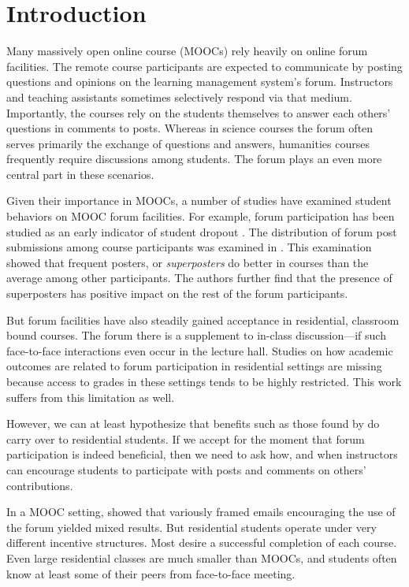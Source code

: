 \section{Introduction}

Many massively open online course (MOOCs) rely heavily on online forum
facilities. The remote course participants are expected to communicate
by posting questions and opinions on the learning management system's
forum. Instructors and teaching assistants sometimes selectively
respond via that medium. Importantly, the courses rely on the students
themselves to answer each others' questions in comments to
posts. Whereas in science courses the forum often serves primarily the
exchange of questions and answers, humanities courses frequently
require discussions among students. The forum plays an even more
central part in these scenarios.

Given their importance in MOOCs, a number of studies have examined
student behaviors on MOOC forum facilities. For example, forum
participation has been studied as an early indicator of student
dropout \cite{yang2013}. The distribution of forum post submissions
among course participants was examined in \cite{Huang2014}. This
examination showed that frequent posters, or {\em superposters} do
better in courses than the average among other participants. The
authors further find that the presence of superposters has positive
impact on the rest of the forum participants.

But forum facilities have also steadily gained acceptance in
residential, classroom bound courses. The forum there is a supplement
to in-class discussion---if such face-to-face interactions even occur
in the lecture hall. Studies on how academic outcomes are related to
forum participation in residential settings are missing because access
to grades in these settings tends to be highly restricted. This work
suffers from this limitation as well.

However, we can at least hypothesize that benefits such as those found
by \cite{Huang2014} do carry over to residential students. If we
accept for the moment that forum participation is indeed beneficial,
then we need to ask how, and when instructors can encourage students
to participate with posts and comments on others' contributions.

In a MOOC setting, \cite{kizilcec2014encouraging} showed that
variously framed emails encouraging the use of the forum yielded mixed
results. But residential students operate under very different
incentive structures. Most desire a successful completion of each
course. Even large residential classes are much smaller than MOOCs,
and students often know at least some of their peers from face-to-face
meeting.

